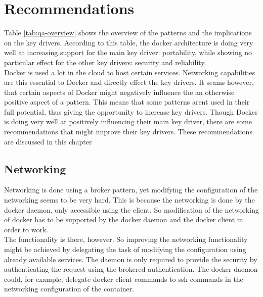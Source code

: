 
\clearpage
\chapter{Recommendations}
\label{ch:recommendations}
Table \ref{tab:qa-overview} shows the overview of the patterns and the implications on the key drivers. According to this table, the docker architecture is doing very well at increasing support for the main key driver: portability, while showing no particular effect for the other key drivers: security and reliability.\\
Docker is used a lot in the cloud to host certain services. Networking capabilities are this essential to Docker and directly effect the key drivers. It seams however, that certain aspects of Docker might negatively influence the an otherwise positive aspect of a pattern. This means that some patterns arent used in their full potential, thus giving the opportunity to increase key drivers.
Though Docker is doing very well at positively influencing their main key driver, there are some recommendations that might improve their key drivers. These recommendations are discussed in this chapter \\

\section{Networking}
Networking is done using a broker pattern, yet modifying the configuration of the networking seems to be very hard. This is because the networking is done by the docker daemon, only accessible using the client. So modification of the networking of docker has to be supported by the docker daemon and the docker client in order to work.\\
The functionality is there, however. So improving the networking functionality might be achieved by delegating the task of modifying the  configuration using already available services. The daemon is only required to provide the security by authenticating the request using the brokered authentication. The docker daemon could, for example, delegate docker client commands to ssh commands in the networking configuration of the container. \\

